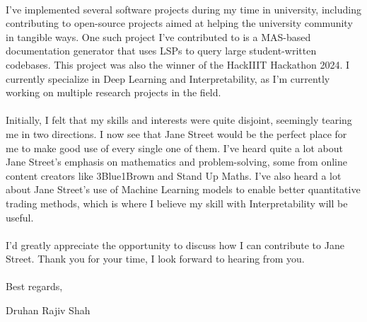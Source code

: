 \documentclass[11pt]{article}
\begin{document}
\paragraph{} I've implemented several software projects during my time in university, including contributing to open-source projects aimed at helping the university community in tangible ways. One such project I've contributed to is a MAS-based documentation generator that uses LSPs to query large student-written codebases. This project was also the winner of the HackIIIT Hackathon 2024. I currently specialize in Deep Learning and Interpretability, as I'm currently working on multiple research projects in the field.

\paragraph{} Initially, I felt that my skills and interests were quite disjoint, seemingly tearing me in two directions. I now see that Jane Street would be the perfect place for me to make good use of every single one of them. I've heard quite a lot about Jane Street's emphasis on mathematics and problem-solving, some from online content creators like 3Blue1Brown and Stand Up Maths. I've also heard a lot about Jane Street's use of Machine Learning models to enable better quantitative trading methods, which is where I believe my skill with Interpretability will be useful.

\paragraph{} I'd greatly appreciate the opportunity to discuss how I can contribute to Jane Street. Thank you for your time, I look forward to hearing from you.

\paragraph{} Best regards,

Druhan Rajiv Shah
\end{document}
